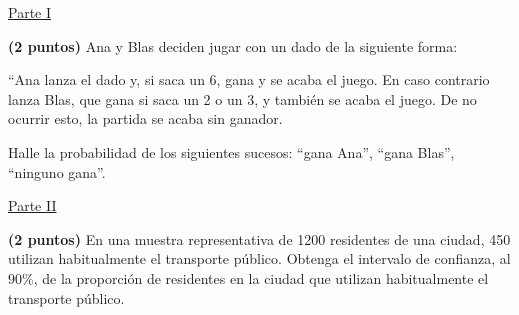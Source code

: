 
\noindent\underline{Parte I}

\textbf{(2 puntos)} Ana y Blas deciden jugar con un dado de la siguiente forma:

``Ana lanza el dado y, si saca un 6, gana y se acaba el juego. En caso contrario lanza Blas, que gana si saca un 2 o un 3, y también se acaba el juego. De no ocurrir esto, la partida se acaba sin ganador.

Halle la probabilidad de los siguientes sucesos: ``gana Ana'', ``gana Blas'', ``ninguno gana''.
\par\noindent\begin{minipage}{\linewidth}
\noindent\underline{Parte II}

\textbf{(2 puntos)} En una muestra representativa de 1200 residentes de una ciudad, 450 utilizan habitualmente el transporte público. Obtenga el intervalo de confianza, al $90\%$, de la proporción de residentes en la ciudad que utilizan habitualmente el transporte público.
\end{minipage}\par
